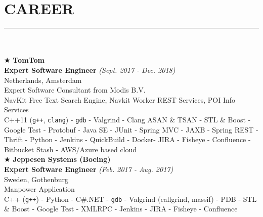 \documentclass[10pt,a4paper]{article}
\begin{document}
\section{CAREER}
\noindent\rule {18.0cm}{0.2pt} \\ \\
$\bigstar$ \hspace{0.1cm} \large \textbf{TomTom} \\
\indent \small \textbf{Expert Software Engineer} \textsl{(Sept. 2017 - Dec. 2018)} \\
\indent \textnormal{Netherlands, Amsterdam} \\
\indent \textbullet \hspace{0.05cm} Expert Software Consultant from Modis B.V. \\
\indent \textbullet \hspace{0.05cm} NavKit Free Text Search Engine, Navkit Worker REST Services, POI Info Services \\
\indent \textbullet \hspace{0.05cm} C++11 (\texttt{g++}, \texttt{clang}) - \texttt{gdb} - Valgrind - Clang ASAN \& TSAN - STL \& Boost - Google Test - Protobuf - Java SE - JUnit - Spring MVC - JAXB - Spring REST - Thrift - Python - Jenkins - QuickBuild - Docker- JIRA - Fisheye - Confluence - Bitbucket Stash - AWS/Azure based cloud \\

\noindent $\bigstar$ \hspace{0.1cm} \large \textbf{Jeppesen Systems (Boeing)} \\
\indent \small \textbf{Expert Software Engineer} \textsl{(Feb. 2017 - Aug. 2017)} \\
\indent \textnormal{Sweden, Gothenburg} \\
\indent \textbullet \hspace{0.05cm} Manpower Application \\
\indent \textbullet \hspace{0.05cm} C++ (\texttt{g++}) - Python - C\#.NET - \texttt{gdb} - Valgrind (callgrind, massif) - PDB - STL \& Boost - Google Test - XMLRPC - Jenkins - JIRA - Fisheye - Confluence

\break
\end{document}
